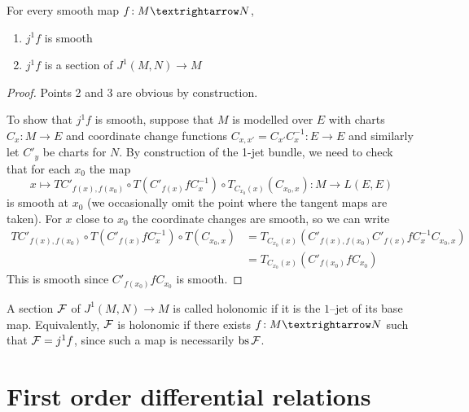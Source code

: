 \begin{lemma}
\label{lem:one_jet_extension_prop}
\leanok
{}
For every smooth map $f \co M → N$,
\begin{enumerate}
  \item
    \label{lem:one_jet_smooth}
    $j^1f$ is smooth
  \item
    \label{lem:one_jet_section}
    $j^1f$ is a section of $J^1(M, N) → M$
\end{enumerate}
\end{lemma}

\begin{proof}
  \leanok
  Points 2 and 3 are obvious by construction.

  To show that $j^1f$ is smooth, suppose that $M$ is modelled over $E$ with charts
  $C_x : M \to E$ and coordinate change functions
  $C_{x,x'}=C_{x'}C_x^{-1} : E \to E$ and similarly let $C'_y$ be charts for $N$.
  By construction of the 1-jet bundle, we need to check that for each $x_0$ the map
  $$x\mapsto TC'_{f(x),f(x_0)}\circ T(C'_{f(x)}fC_x^{-1})\circ
    T_{C_{x_0}(x)}(C_{x_0,x}): M \to L(E,E)$$
  is smooth at $x_0$ (we occasionally omit the point where the tangent maps are taken).
  For $x$ close to $x_0$ the coordinate changes are smooth, so we can write
  \begin{align*}
  TC'_{f(x),f(x_0)}\circ T(C'_{f(x)}fC_x^{-1})\circ T(C_{x_0,x})
  &= T_{C_{x_0}(x)}(C'_{f(x),f(x_0)}C'_{f(x)}fC_x^{-1}C_{x_0,x})\\
  &= T_{C_{x_0}(x)}(C'_{f(x_0)}fC_{x_0})
  \end{align*}
  This is smooth since $C'_{f(x_0)}fC_{x_0}$ is smooth.
\end{proof}

\begin{definition}
\label{def:holonomic_section}
\leanok
{}
A section $\mathcal{F}$ of $J^1(M, N) → M$ is called holonomic if it is the
$1$--jet of its base map.
Equivalently, $\mathcal{F}$ is holonomic if there exists
$f \co M → N$ such that $\mathcal{F} = j^1f$, since such a map is
necessarily $\operatorname{bs} \mathcal{F}$.
\end{definition}

\section{First order differential relations}

